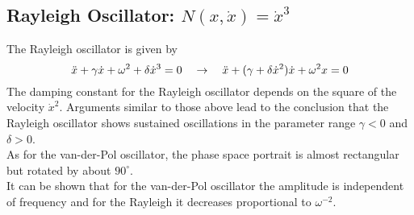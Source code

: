 \subsection{Rayleigh Oscillator: $N(x,\dot{x})=\dot{x}^3$}
The Rayleigh oscillator is given by
\begin{equation}{\label{eq:ro}}
	\ddot{x}+\gamma\dot{x}+\omega^2+\delta\dot{x}^3=0\quad\rightarrow\quad
	\ddot{x}+(\gamma+\delta\dot{x}^2)\dot{x}+\omega^2x=0
\end{equation}
The damping constant for the Rayleigh oscillator depends on the square of the velocity $\dot{x}^2$.
Arguments similar to those above lead to the conclusion that the Rayleigh oscillator shows sustained oscillations in the parameter range $\gamma<0$ and $\delta>0$.\\
As for the van-der-Pol oscillator, the phase space portrait is almost rectangular but rotated by about $90^\circ$.\\
It can be shown that for the van-der-Pol oscillator the amplitude is independent of frequency and for the Rayleigh it decreases proportional to $\omega^{-2}$.